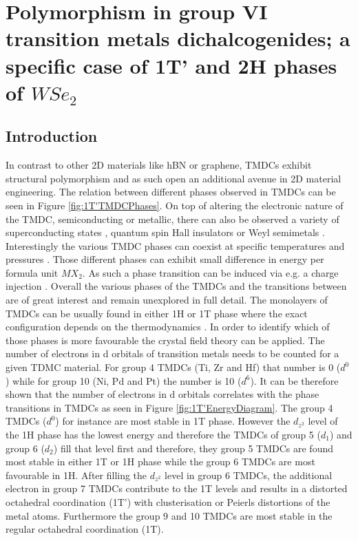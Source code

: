 \chapter{Polymorphism in group VI transition metals dichalcogenides; a specific case of 1T' and 2H phases of $WSe_2$}

\section{Introduction}

In contrast to other 2D materials like hBN or graphene, TMDCs exhibit structural polymorphism and as such open an additional avenue in 2D material engineering. The relation between different phases observed in TMDCs can be seen in Figure \ref{fig:1T'TMDCPhases}. On top of altering the electronic nature of the TMDC, semiconducting or metallic, there can also be observed a variety of superconducting states \cite{Saito2015}\cite{Lu2015}, quantum spin Hall insulators \cite{Qian2014}\cite{Choe2016}\cite{Liu2016a}\cite{Fei2017} or Weyl semimetals \cite{Sun2015}. Interestingly the various TMDC phases can coexist at specific temperatures and pressures \cite{Kappera2014}\cite{Keum2015}\cite{Cho2015}. Those different phases can exhibit small difference in energy per formula unit $MX_2$. As such a phase transition can be induced via e.g. a charge injection \cite{Duerloo2014}. Overall the various phases of the TMDCs and the transitions between are of great interest and remain unexplored in full detail.
The monolayers of TMDCs can be usually found in either 1H or 1T phase where the exact configuration depends on the thermodynamics \cite{Keum2015}\cite{Cho2015}. In order to identify which of those phases is more favourable the crystal field theory can be applied. The number of electrons in d orbitals of transition metals needs to be counted for a given TDMC material. For group 4 TMDCs (Ti, Zr and Hf) that number is 0 ($d^0$) while for group 10 (Ni, Pd and Pt) the number is 10 ($d^6$). It can be therefore shown that the number of electrons in d orbitals correlates with the phase transitions in TMDCs as seen in Figure \ref{fig:1T'EnergyDiagram}. The group 4 TMDCs ($d^0$) for instance are most stable in 1T phase. However the $d_{z^2}$ level of the 1H phase has the lowest energy and therefore the TMDCs of group 5 ($d_1$) and group 6 ($d_2$) fill that level first and therefore, they group 5 TMDCs are found most stable in  either 1T or 1H phase while the group 6 TMDCs are most favourable in 1H. After filling the $d_{z^2}$ level in group 6 TMDCs, the additional electron in group 7 TMDCs contribute to the 1T levels and results in a distorted octahedral coordination (1T') with clusterisation or Peierls distortions of the metal atoms. Furthermore the group 9 and 10 TMDCs are most stable in the regular octahedral coordination (1T).

